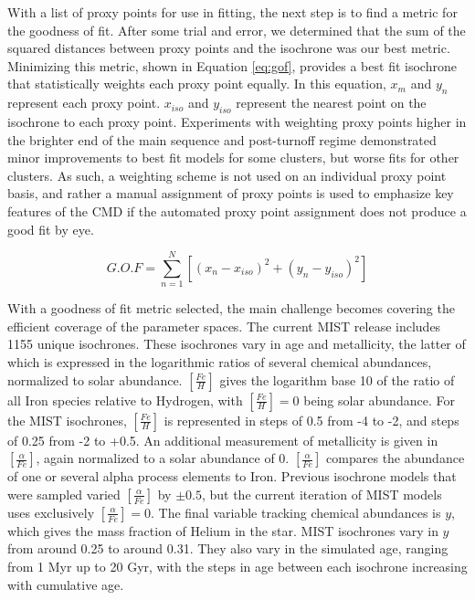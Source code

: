 \documentclass[onecolumn,table,xcdraw,super]{aastex631}
\newcommand{\beq}{\begin{equation}}
\newcommand{\eeq}{\end{equation}}
\begin{document}
With a list of proxy points for use in fitting, the next step is to find a metric for the goodness of fit. After some trial and error, we determined that the sum of the squared distances between proxy points and the isochrone was our best metric. Minimizing this metric, shown in Equation \ref{eq:gof}, provides a best fit isochrone that statistically weights each proxy point equally. In this equation, $x_m$ and $y_n$ represent each proxy point. $x_{iso}$ and $y_{iso}$ represent the nearest point on the isochrone to each proxy point. Experiments with weighting proxy points higher in the brighter end of the main sequence and post-turnoff regime demonstrated minor improvements to best fit models for some clusters, but worse fits for other clusters. As such, a weighting scheme is not used on an individual proxy point basis, and rather a manual assignment of proxy points is used to emphasize key features of the CMD if the automated proxy point assignment does not produce a good fit by eye.

\beq
\label{eq:gof}
G.O.F = \sum\limits_{n=1}^{N}\left[\left(x_n-x_{iso}\right)^2+\left(y_n-y_{iso}\right)^2\right]
\eeq

With a goodness of fit metric selected, the main challenge becomes covering the efficient coverage of the parameter spaces. The current MIST release includes 1155 unique isochrones. These isochrones vary in age and metallicity, the latter of which is expressed in the logarithmic ratios of several chemical abundances, normalized to solar abundance. $[\frac{Fe}{H}]$ gives the logarithm base 10 of the ratio of all Iron species relative to Hydrogen, with $[\frac{Fe}{H}]=0$ being solar abundance. For the MIST isochrones, $[\frac{Fe}{H}]$ is represented in steps of 0.5 from -4 to -2, and steps of 0.25 from -2 to +0.5. An additional measurement of metallicity is given in $[\frac{\alpha}{Fe}]$, again normalized to a solar abundance of 0. $[\frac{\alpha}{Fe}]$ compares the abundance of one or several alpha process elements to Iron. Previous isochrone models that were sampled varied $[\frac{\alpha}{Fe}]$ by $\pm 0.5$, but the current iteration of MIST models uses exclusively $[\frac{\alpha}{Fe}]=0$. The final variable tracking chemical abundances is $y$, which gives the mass fraction of Helium in the star. MIST isochrones vary in $y$ from around 0.25 to around 0.31. They also vary in the simulated age, ranging from 1 Myr up to 20 Gyr, with the steps in age between each isochrone increasing with cumulative age.
\end{document}

